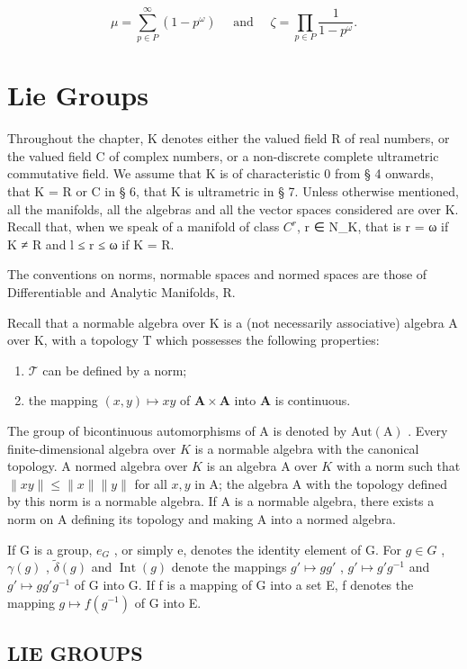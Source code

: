 \[
\mu = \sum_ {p \in P} ^ {\infty} (1 - p ^ {\omega}) \quad \text { and } \quad \zeta = \prod_ {p \in P} \frac {1}{1 - p ^ {\omega}}.
\]

\chapter{Lie Groups}

Throughout the chapter, K denotes either the valued field R of real numbers, or the valued field C of complex numbers, or a non-discrete complete ultrametric commutative field. We assume that K is of characteristic 0 from § 4 onwards, that K = R or C in § 6, that K is ultrametric in § 7. Unless otherwise mentioned, all the manifolds, all the algebras and all the vector spaces considered are over K. Recall that, when we speak of a manifold of class \(C^{r}\), r ∈ N\_K, that is r = ω if K ≠ R and l ≤ r ≤ ω if K = R.

The conventions on norms, normable spaces and normed spaces are those of Differentiable and Analytic Manifolds, R.

Recall that a normable algebra over K is a (not necessarily associative) algebra A over K, with a topology T which possesses the following properties:

\begin{enumerate}
\def\labelenumi{(\arabic{enumi})}
\item
  \(\mathcal{T}\) can be defined by a norm;
\item
  the mapping \((x,y)\mapsto xy\) of \(\mathbf{A}\times \mathbf{A}\) into \(\mathbf{A}\) is continuous.
\end{enumerate}

The group of bicontinuous automorphisms of A is denoted by \(\mathrm{Aut(A)}\) . Every finite-dimensional algebra over \(K\) is a normable algebra with the canonical topology. A normed algebra over \(K\) is an algebra A over \(K\) with a norm such that \(\| xy\| \leqslant \| x\|\| y\|\) for all \(x,y\) in A; the algebra A with the topology defined by this norm is a normable algebra. If A is a normable algebra, there exists a norm on A defining its topology and making A into a normed algebra.

If G is a group, \(e_{G}\) , or simply e, denotes the identity element of G. For \(g \in G\) , \(\gamma(g)\) , \(\tilde{\delta}(g)\) and \(\operatorname{Int}(g)\) denote the mappings \(g' \mapsto gg'\) , \(g' \mapsto g'g^{-1}\) and \(g' \mapsto gg'g^{-1}\) of G into G. If f is a mapping of G into a set E, f denotes the mapping \(g \mapsto f(g^{-1})\) of G into E.

\section{LIE GROUPS}
